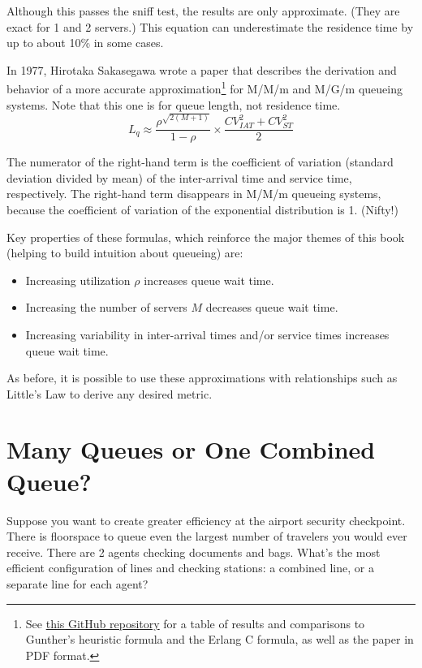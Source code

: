 \documentclass{vivid_layout}
\begin{document}
Although this passes the sniff test, the results are only approximate. (They are exact for 1 and 2 servers.) This equation can underestimate the residence time by up to about 10\% in some cases.

In 1977, Hirotaka Sakasegawa wrote a paper that describes the derivation and behavior of a more accurate approximation\footnote{See \href{https://github.com/VividCortex/approx-queueing-theory}{this GitHub repository} for a table of results and comparisons to Gunther's heuristic formula and the Erlang C formula, as well as the paper in PDF format.} for M/M/m and M/G/m queueing systems. Note that this one is for queue length, not residence time.
\[
L_q \approx \frac{ \rho^{\sqrt{2(M+1)}} }{ 1-\rho} \times \frac {CV_{IAT}^2 + CV_{ST}^2}{2}
\]

The numerator of the right-hand term is the coefficient of variation (standard deviation divided by mean) of the inter-arrival time and service time, respectively. The right-hand term disappears in M/M/m queueing systems, because the coefficient of variation of the exponential distribution is 1. (Nifty!)

Key properties of these formulas, which reinforce the major themes of this book (helping to build intuition about queueing) are:

\begin{itemize}
\item Increasing utilization \( \rho \) increases queue wait time.
\item Increasing the number of servers \(M\) decreases queue wait time.
\item Increasing variability in inter-arrival times and/or service times increases queue wait time.
\end{itemize}

As before, it is possible to use these approximations with relationships such as Little's Law to derive any desired metric.

\section{Many Queues or One Combined Queue?}

Suppose you want to create greater efficiency at the airport security checkpoint. There is floorspace to queue even the largest number of travelers you would ever receive. There are 2 agents checking documents and bags. What's the most efficient configuration of lines and checking stations: a combined line, or a separate line for each agent?
\end{document}
